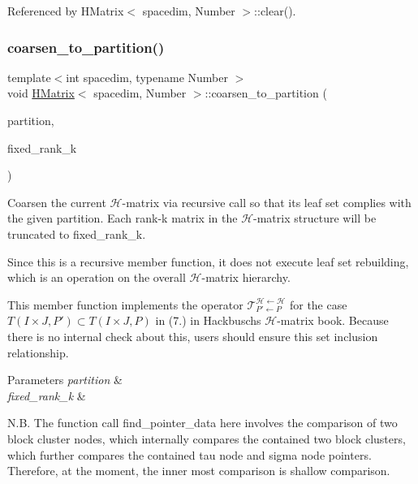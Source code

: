 Referenced by H\+Matrix$<$ spacedim, Number $>$\+::clear().

\mbox{\label{classHMatrix_a525ad4d453f4f496b98cccb341c8b60b}} 
\subsubsection{\texorpdfstring{coarsen\+\_\+to\+\_\+partition()}{coarsen\_to\_partition()}}
{\footnotesize\ttfamily template$<$int spacedim, typename Number $>$ \\
void \hyperlink{classHMatrix}{H\+Matrix}$<$ spacedim, Number $>$\+::coarsen\+\_\+to\+\_\+partition (\begin{DoxyParamCaption}\item[{const std\+::vector$<$ typename \hyperlink{classBlockClusterTree}{Block\+Cluster\+Tree}$<$ spacedim, Number $>$\+::node\+\_\+pointer\+\_\+type $>$ \&}]{partition,  }\item[{const unsigned int}]{fixed\+\_\+rank\+\_\+k }\end{DoxyParamCaption})}

Coarsen the current $\mathcal{H}$-\/matrix via recursive call so that its leaf set complies with the given partition. Each rank-\/k matrix in the $\mathcal{H}$-\/matrix structure will be truncated to {\ttfamily fixed\+\_\+rank\+\_\+k}.

Since this is a recursive member function, it does not execute leaf set rebuilding, which is an operation on the overall $\mathcal{H}$-\/matrix hierarchy.

This member function implements the operator $\mathcal{T}_{P' \leftarrow P}^{\mathcal{H} \leftarrow \mathcal{H}}$ for the case $T(I \times J, P') \subset T(I \times J, P)$ in (7.) in Hackbusch\textquotesingle{}s $\mathcal{H}$-\/matrix book. Because there is no internal check about this, users should ensure this set inclusion relationship.


\begin{DoxyParams}{Parameters}
{\em partition} & \\
\hline
{\em fixed\+\_\+rank\+\_\+k} & \\
\hline
\end{DoxyParams}
N.\+B. The function call {\ttfamily find\+\_\+pointer\+\_\+data} here involves the comparison of two block cluster nodes, which internally compares the contained two block clusters, which further compares the contained tau node and sigma node pointers. Therefore, at the moment, the inner most comparison is shallow comparison.

